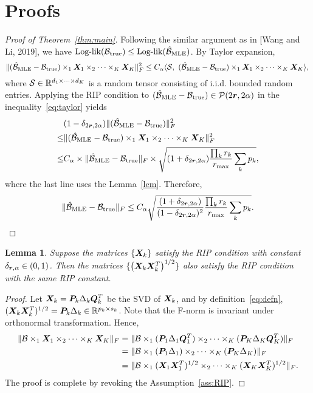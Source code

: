 \documentclass[11pt]{article}
\theoremstyle{plain}
\newtheorem{lem}{Lemma}
\theoremstyle{definition}
\begin{document}
\section{Proofs}

\begin{proof}[Proof of Theorem~\ref{thm:main}]
Following the similar argument as in [Wang and Li, 2019], we have $\text{Log-lik}(\mathcal{B}_\text{true})\leq \text{Log-lik}(\hat {\mathcal{B}}_{\text{MLE}})$. By Taylor expansion, 
\begin{equation}\label{eq:taylor}
\lVert(\hat {\mathcal{B}}_{\text{MLE}}-\mathcal{B}_{\text{true}})\times_1 \bm X_1\times_2 \cdots\times_K \bm X_K\rVert_F^2 \leq C_\alpha\langle \mathcal{S},\ (\hat {\mathcal{B}}_{\text{MLE}}-\mathcal{B}_{\text{true}})\times_1 \bm X_1\times_2 \cdots\times_K \bm X_K \rangle ,\\
\end{equation}
where $\mathcal{S}\in\mathbb{R}^{d_1\times \cdots \times d_K}$ is a random tensor consisting of i.i.d. bounded random entries. Applying the RIP condition to $(\hat {\mathcal{B}}_{\text{MLE}}-\mathcal{B}_{\text{true}})\in\mathcal{P}(2\bm{r},2\alpha)$ in the inequality~\eqref{eq:taylor} yields
\begin{align}
&(1-\delta_{2\bm{r},2\alpha})\lVert(\hat {\mathcal{B}}_{\text{MLE}}-\mathcal{B}_{\text{true}})\rVert_F^2\\
\leq &\lVert(\hat {\mathcal{B}}_{\text{MLE}}-\mathcal{B}_{\text{true}})\times_1 \bm X_1\times_2 \cdots\times_K \bm X_K\rVert_F^2\\
\leq & C_\alpha\times \lVert\hat {\mathcal{B}}_{\text{MLE}}-\mathcal{B}_{\text{true}}\rVert_F\times \sqrt{ (1+\delta_{2\bm{r},2\alpha}) {\prod_k r_k\over r_{\max}}\sum_k p_k},
\end{align}
where the last line uses the Lemma~\ref{lem}. Therefore,
\[
\lVert\hat {\mathcal{B}}_{\text{MLE}}-\mathcal{B}_{\text{true}}\rVert_F\leq C_\alpha \sqrt{ {(1+\delta_{2\bm{r},2\alpha})\over(1-\delta_{2\bm{r},2\alpha})^2}  {\prod_k r_k \over r_{\max}} \sum_k p_k}.
\]
\end{proof}


\begin{lem}\label{lemma:RIP}
Suppose the matrices $\{\bm X_k\}$ satisfy the RIP condition with constant $\delta_{\bm{r},\alpha}\in(0,1)$. Then the matrices $\{ \left(\bm X_k\bm X^T_k\right)^{1/2}\}$ also satisfy the RIP condition with the same RIP constant. 
\end{lem}
\begin{proof}
Let $\bm X_k=\bm{P}_k\Delta_k \bm{Q}^T_k$ be the SVD of $\bm X_k$, and by definition~\ref{eq:defn}, $(\bm X_k\bm X^T_k)^{1/2}=\bm{P}_k\Delta_k\in\mathbb{R}^{p_k\times s_k}$. Note that the F-norm is invariant under orthonormal transformation. Hence,
\begin{align}
\lVert\mathcal{B}\times_1\bm X_1\times_2\cdots\times_K\bm X_K\rVert_F&=\lVert\mathcal{B}\times_1(\bm{P}_1\Delta_1\bm{Q}^T_1)\times_2\cdots\times_K(\bm{P}_K\Delta_K\bm{Q}^T_K)\rVert_F\\
&=\lVert\mathcal{B}\times_1 (\bm{P}_1\Delta_1)\times_2\cdots\times_K(\bm{P}_K\Delta_K)\rVert_F\\
&=\lVert\mathcal{B}\times_1 (\bm X_1\bm X^T_1)^{1/2}\times_2\cdots\times_K (\bm X_K\bm X^T_K)^{1/2} \rVert_F.
\end{align}
The proof is complete by revoking the Assumption~\ref{ass:RIP}.
\end{proof}
\end{document}
